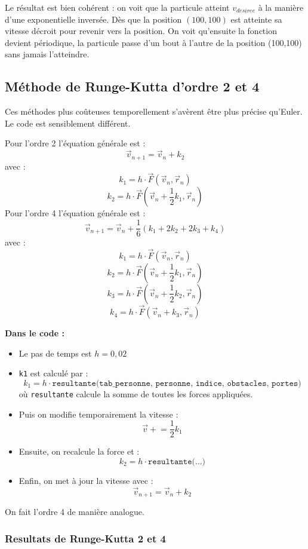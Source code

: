 \documentclass[a4paper,12pt]{article}
\begin{document}
Le résultat est bien cohérent : on voit que la particule atteint $v_{desiree}$ à la manière d'une exponentielle inversée. Dès que la position $(100,100)$ est atteinte sa vitesse décroit pour revenir vers la position. On voit qu'ensuite la fonction devient périodique, la particule passe d'un bout à l'autre de la position (100,100) sans jamais l'atteindre.


\subsection*{Méthode de Runge-Kutta d'ordre 2 et 4}

Ces méthodes plus coûteuses temporellement s'avèrent être plus précise qu'Euler. Le code est sensiblement différent.

Pour l'ordre 2 l'équation générale est :
\[
\vec{v}_{n+1} = \vec{v}_n + k_2
\]
avec :
\[
k_1 = h \cdot \vec{F}(\vec{v}_n, \vec{r}_n)
\]
\[
k_2 = h \cdot \vec{F} \left( \vec{v}_n + \frac{1}{2}k_1, \vec{r}_n \right)
\]
Pour l'ordre 4 l'équation générale est :
\[
\vec{v}_{n+1} = \vec{v}_n + \frac{1}{6}(k_1+2k_2+2k_3+k_4)
\]
avec :
\[
k_1 = h \cdot \vec{F}(\vec{v}_n, \vec{r}_n)
\]
\[
k_2 = h \cdot \vec{F} \left( \vec{v}_n + \frac{1}{2}k_1, \vec{r}_n \right)
\]
\[
k_3 = h \cdot \vec{F} \left( \vec{v}_n + \frac{1}{2}k_2, \vec{r}_n \right)
\]
\[
k_4 = h \cdot \vec{F} \left( \vec{v}_n + k_3, \vec{r}_n \right)
\]

\textbf{Dans le code :}
\begin{itemize}
    \item Le pas de temps est $h = 0{,}02$
    \item \texttt{k1} est calculé par :
    \[
    k_1 = h \cdot \texttt{resultante(tab\_personne, personne, indice, obstacles, portes)}
    \]
    où \texttt{resultante} calcule la somme de toutes les forces appliquées.
    \item Puis on modifie temporairement la vitesse :
    \[
    \vec{v} \mathrel{+}= \frac{1}{2} k_1
    \]
    \item Ensuite, on recalcule la force et :
    \[
    k_2 = h \cdot \texttt{resultante(...)}
    \]
    \item Enfin, on met à jour la vitesse avec :
    \[
    \vec{v}_{n+1} = \vec{v}_n + k_2
    \]
\end{itemize}
On fait l'ordre 4 de manière analogue.

\subsubsection{Resultats de Runge-Kutta 2 et 4}
\end{document}
